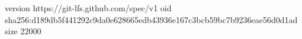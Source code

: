 version https://git-lfs.github.com/spec/v1
oid sha256:d189db5f441292c9da0e628665edb43936e167c3bcb59bc7b9236eae56d0d1ad
size 22000
